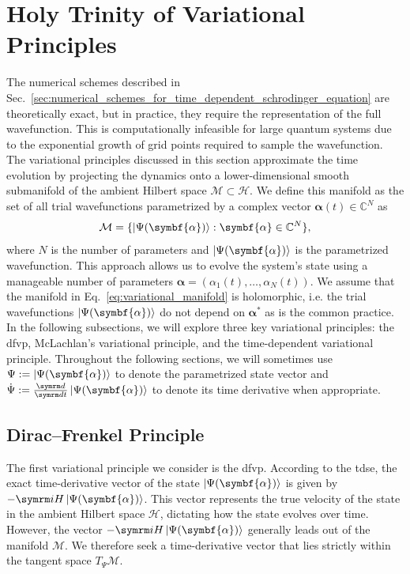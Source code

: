 \section{Holy Trinity of Variational Principles}\label{sec:variational_principles}
The numerical schemes described in Sec.~\ref{sec:numerical_schemes_for_time_dependent_schrodinger_equation} are theoretically exact, but in practice, they require the representation of the full wavefunction. This is computationally infeasible for large quantum systems due to the exponential growth of grid points required to sample the wavefunction. The variational principles discussed in this section approximate the time evolution by projecting the dynamics onto a lower-dimensional smooth submanifold of the ambient Hilbert space $\mathcal{M}\subset\mathcal{H}$. We define this manifold as the set of all trial wavefunctions parametrized by a complex vector $\symbf{\alpha}(t)\in\mathbb{C}^N$ as
\begin{equation}\label{eq:variational_manifold}
\mathcal{M}=\lbrace\ket{\Psi(\symbf{\alpha})}:\symbf{\alpha}\in\mathbb{C}^N\rbrace,
\end{equation}
where $N$ is the number of parameters and $\ket{\Psi(\symbf{\alpha})}$ is the parametrized wavefunction. This approach allows us to evolve the system's state using a manageable number of parameters $\symbf{\alpha}=(\alpha_1(t),\ldots,\alpha_N(t))$. We assume that the manifold in Eq.~\eqref{eq:variational_manifold} is holomorphic, i.e. the trial wavefunctions $\ket{\Psi(\symbf{\alpha})}$ do not depend on $\symbf{\alpha}^\ast$ as is the common practice. In the following subsections, we will explore three key variational principles: the \gls{dfvp}, McLachlan's variational principle, and the time-dependent variational principle. Throughout the following sections, we will sometimes use $\Psi:=\ket{\Psi(\symbf{\alpha})}$ to denote the parametrized state vector and $\dot\Psi:=\ddt\ket{\Psi(\symbf{\alpha})}$ to denote its time derivative when appropriate.
\subsection{Dirac--Frenkel Principle}\label{sec:dirac_frenkel_principle}
The first variational principle we consider is the \gls{dfvp}.\supercite{10.1017/S0305004100016108,1477741} According to the \gls{tdse}, the exact time-derivative vector of the state $\ket{\Psi(\symbf{\alpha})}$ is given by $-\i H\ket{\Psi(\symbf{\alpha})}$. This vector represents the true velocity of the state in the ambient Hilbert space $\mathcal{H}$, dictating how the state evolves over time. However, the vector $-\i H\ket{\Psi(\symbf{\alpha})}$ generally leads out of the manifold $\mathcal{M}$. We therefore seek a time-derivative vector that lies strictly within the tangent space $T_{\Psi}\mathcal{M}$.

